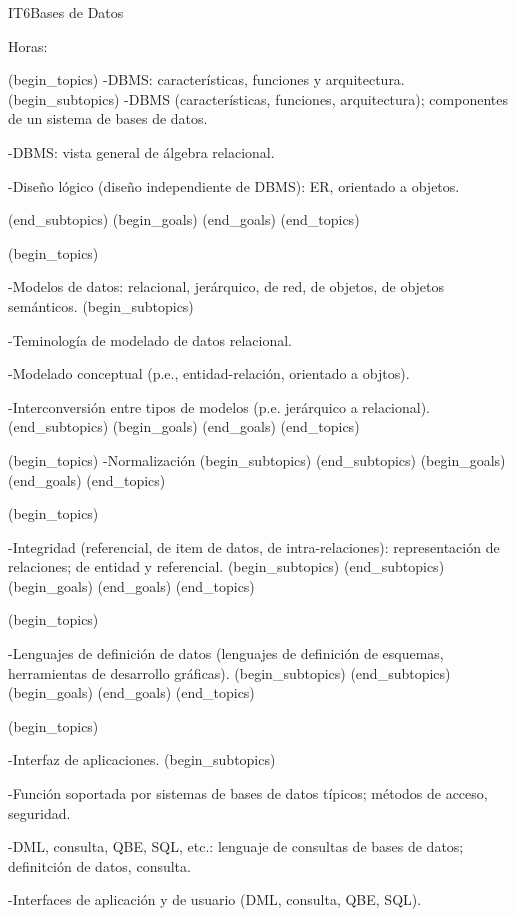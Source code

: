 \begin{BKL2}{IT6}{Bases de Datos}

Horas:
 
(begin_topics)
-DBMS: caracterí­sticas, funciones y arquitectura.
(begin_subtopics)
-DBMS (caracterí­sticas, funciones, arquitectura); componentes de un sistema de bases de datos.

-DBMS: vista general de álgebra relacional.

-Diseño lógico (diseño independiente de DBMS): ER, orientado a objetos.

(end_subtopics)
(begin_goals)
(end_goals)
(end_topics)

 

(begin_topics)

-Modelos de datos: relacional, jerárquico, de red, de objetos, de objetos semánticos.
(begin_subtopics)

-Teminologí­a de modelado de datos relacional.

-Modelado conceptual (p.e., entidad-relación, orientado a objtos).

-Interconversión entre tipos de modelos (p.e. jerárquico a relacional).
(end_subtopics)
(begin_goals)
(end_goals)
(end_topics)

 

(begin_topics)
-Normalización
(begin_subtopics)
(end_subtopics)
(begin_goals)
(end_goals)
(end_topics)

 

(begin_topics)

-Integridad (referencial, de item de datos, de intra-relaciones): representación de relaciones; de entidad y referencial.
(begin_subtopics)
(end_subtopics)
(begin_goals)
(end_goals)
(end_topics)

 

(begin_topics)

-Lenguajes de definición de datos (lenguajes de definición de esquemas, herramientas de desarrollo gráficas).
(begin_subtopics)
(end_subtopics)
(begin_goals)
(end_goals)
(end_topics)

 

(begin_topics)

-Interfaz de aplicaciones.
(begin_subtopics)

-Función soportada por sistemas de bases de datos tí­picos; métodos de acceso, seguridad.

-DML, consulta, QBE, SQL, etc.: lenguaje de consultas de bases de datos; definitción de datos, consulta.

-Interfaces de aplicación y de usuario (DML, consulta, QBE, SQL).


\end{BKL2}
